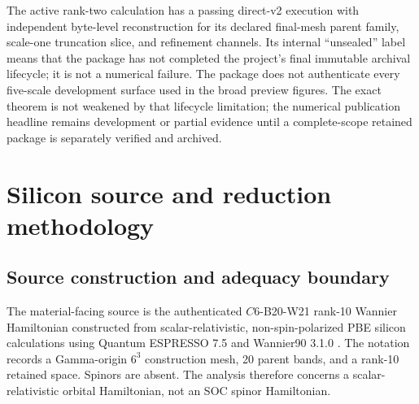 \documentclass[11pt]{article}
\theoremstyle{definition}
\begin{document}
The active rank-two calculation has a passing direct-v2 execution with independent
byte-level reconstruction for its declared final-mesh parent family, scale-one
truncation slice, and refinement channels.  Its internal ``unsealed'' label means that
the package has not completed the project's final immutable archival lifecycle; it is
not a numerical failure.  The package does not authenticate every five-scale development
surface used in the broad preview figures.  The exact theorem is not weakened by that
lifecycle limitation; the numerical publication headline remains development or partial
evidence until a complete-scope retained package is separately verified and archived.

\section{Silicon source and reduction methodology}

\subsection{Source construction and adequacy boundary}

The material-facing source is the authenticated $C6$-B20-W21 rank-10 Wannier Hamiltonian
constructed from scalar-relativistic, non-spin-polarized PBE silicon calculations using
Quantum ESPRESSO 7.5 and Wannier90 3.1.0
\cite{giannozzi2009,giannozzi2017,giannozzi2020,pizzi2020}.  The notation
records a Gamma-origin $6^3$ construction mesh, 20 parent bands, and a rank-10 retained
space.  Spinors are absent.  The analysis therefore concerns a scalar-relativistic
orbital Hamiltonian, not an SOC spinor Hamiltonian.
\end{document}
